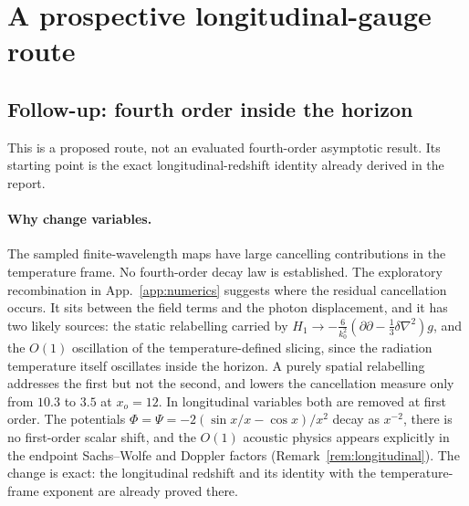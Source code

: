 \section{A prospective longitudinal-gauge route}\label{app:research-route}
\subsection{Follow-up: fourth order inside the horizon}\label{sec:followup-late}
This is a proposed route, not an evaluated fourth-order asymptotic result. Its starting
point is the exact longitudinal-redshift identity already derived in the report.

\paragraph{Why change variables.} The sampled finite-wavelength maps have large cancelling
contributions in the temperature frame. No fourth-order decay law is established. The exploratory recombination in App.~\ref{app:numerics} suggests where
the residual cancellation occurs.
It sits between the field terms and the photon displacement, and it has two likely sources: the
static relabelling carried by $H_1\to-\frac6{k_0^2}(\partial\partial-\frac13\delta\nabla^2)g$,
and the $O(1)$ oscillation of the temperature-defined slicing, since the radiation
temperature itself oscillates inside the horizon. A purely spatial relabelling addresses the
first but not the second, and lowers the cancellation measure only from $10.3$ to $3.5$ at
$x_o=12$. In longitudinal variables both are removed at first order. The potentials
$\Phi=\Psi=-2(\sin x/x-\cos x)/x^2$ decay as $x^{-2}$, there is no first-order scalar shift,
and the $O(1)$ acoustic physics appears explicitly in the endpoint Sachs--Wolfe and Doppler
factors (Remark~\ref{rem:longitudinal}). The change is exact: the longitudinal redshift and
its identity with the temperature-frame exponent are already proved there.

